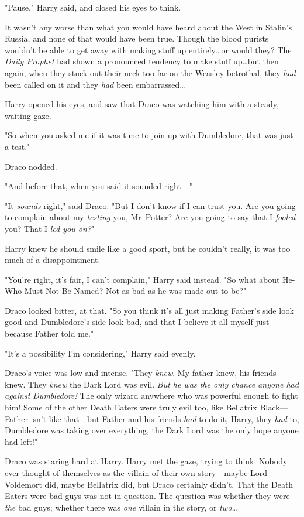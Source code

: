 "Pause," Harry said, and closed his eyes to think.

It wasn’t any worse than what you would have heard about the West in Stalin’s
Russia, and none of that would have been true. Though the blood purists
wouldn’t be able to get away with making stuff up entirely…or would
they? The \emph{Daily Prophet} had shown a pronounced tendency to make stuff
up…but then again, when they stuck out their neck too far on the
Weasley betrothal, they \emph{had} been called on it and they \emph{had} been
embarrassed…

Harry opened his eyes, and saw that Draco was watching him with a steady,
waiting gaze.

"So when you asked me if it was time to join up with Dumbledore, that was just
a test."

Draco nodded.

"And before that, when you said it sounded right—"

"It \emph{sounds} right," said Draco. "But I don’t know if I can trust you. Are
you going to complain about my \emph{testing} you, Mr~Potter? Are you going to
say that I \emph{fooled} you? That I \emph{led you on?}"

Harry knew he should smile like a good sport, but he couldn’t really, it was
too much of a disappointment.

"You’re right, it’s fair, I can’t complain," Harry said instead. "So what about
He-Who-Must-Not-Be-Named? Not as bad as he was made out to be?"

Draco looked bitter, at that. "So you think it’s all just making Father’s side
look good and Dumbledore’s side look bad, and that I believe it all myself just
because Father told me."

"It’s a possibility I’m considering," Harry said evenly.

Draco’s voice was low and intense. "They \emph{knew}. My father knew, his
friends knew. They \emph{knew} the Dark Lord was evil. \emph{But he was the
only chance anyone had against Dumbledore!} The only wizard anywhere who was
powerful enough to fight him! Some of the other Death Eaters were truly evil
too, like Bellatrix Black—Father isn’t like that—but Father and his friends
\emph{had} to do it, Harry, they \emph{had} to, Dumbledore was taking over
everything, the Dark Lord was the only hope anyone had left!"

Draco was staring hard at Harry. Harry met the gaze, trying to think. Nobody
ever thought of themselves as the villain of their own story—maybe Lord
Voldemort did, maybe Bellatrix did, but Draco certainly didn’t. That the Death
Eaters were bad guys was not in question. The question was whether they were
\emph{the} bad guys; whether there was \emph{one} villain in the story, or
\emph{two…}

